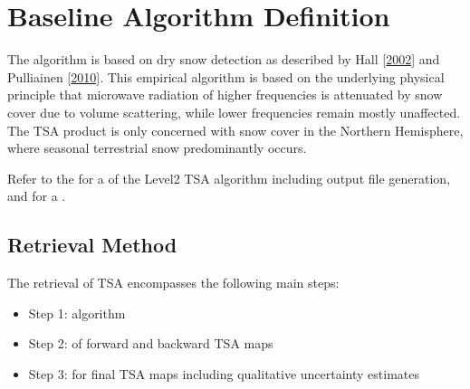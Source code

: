 \documentclass[letterpaper,10pt,english]{jupyterBook}
\begin{document}
\sphinxstepscope


\chapter{Baseline Algorithm Definition}
\label{\detokenize{book/baseline_algorithm_definition:baseline-algorithm-definition}}\label{\detokenize{book/baseline_algorithm_definition::doc}}
\sphinxAtStartPar
The {\hyperref[\detokenize{book/acronyms:term-TSA}]{}} algorithm is based on dry snow detection as described by Hall  {[}\hyperlink{cite.book/references:id2}{2002}{]} and Pulliainen  {[}\hyperlink{cite.book/references:id3}{2010}{]}. This empirical algorithm is based on the underlying physical principle that microwave radiation of higher frequencies is attenuated by snow cover due to volume scattering, while lower frequencies remain mostly unaffected.
The TSA product is only concerned with snow cover in the Northern Hemisphere, where seasonal terrestrial snow predominantly occurs.


\nopagebreak


\sphinxAtStartPar
Refer to the {\hyperref[\detokenize{book/annex:content-annex}]{}} for a {\hyperref[\detokenize{algorithm/run_CIMR_L2_TSA::doc}]{}} of the Level\sphinxhyphen{}2 TSA algorithm including output file generation, and for a {\hyperref[\detokenize{algorithm/CIMR_L2_TSA_PICASSO::doc}]{}}.




\section{Retrieval Method}
\label{\detokenize{book/baseline_algorithm_definition:retrieval-method}}
\sphinxAtStartPar
The retrieval of TSA encompasses the following main steps:
\begin{itemize}
\item {} 
\sphinxAtStartPar
Step 1:  algorithm

\item {} 
\sphinxAtStartPar
Step 2:  of forward and backward TSA maps

\item {} 
\sphinxAtStartPar
Step 3:  for final TSA maps including qualitative uncertainty estimates

\end{itemize}
\end{document}
